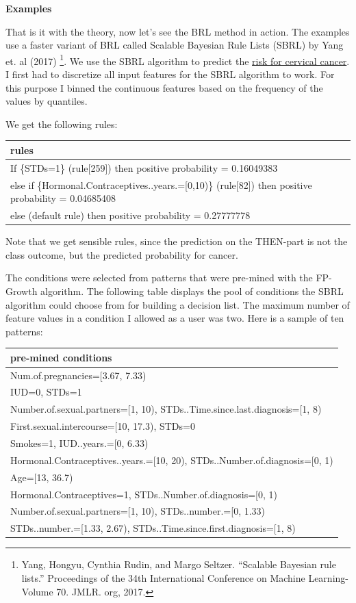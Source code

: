 \documentclass[12pt,]{krantz}
\begin{document}
\textbf{Examples}

That is it with the theory, now let's see the BRL method in action. The
examples use a faster variant of BRL called Scalable Bayesian Rule Lists
(SBRL) by Yang et. al (2017) \footnote{Yang, Hongyu, Cynthia Rudin, and
  Margo Seltzer. ``Scalable Bayesian rule lists.'' Proceedings of the
  34th International Conference on Machine Learning-Volume 70. JMLR.
  org, 2017.}. We use the SBRL algorithm to predict the
\protect\hyperlink{cervical}{risk for cervical cancer}. I first had to
discretize all input features for the SBRL algorithm to work. For this
purpose I binned the continuous features based on the frequency of the
values by quantiles.

We get the following rules:

\begin{tabular}{>{\raggedright\arraybackslash}p{10cm}}
\hline
rules\\
\hline
If      \{STDs=1\} (rule[259]) then positive probability = 0.16049383\\
\hline
else if \{Hormonal.Contraceptives..years.=[0,10)\} (rule[82]) then positive probability = 0.04685408\\
\hline
else  (default rule)  then positive probability = 0.27777778\\
\hline
\end{tabular}

Note that we get sensible rules, since the prediction on the THEN-part
is not the class outcome, but the predicted probability for cancer.

The conditions were selected from patterns that were pre-mined with the
FP-Growth algorithm. The following table displays the pool of conditions
the SBRL algorithm could choose from for building a decision list. The
maximum number of feature values in a condition I allowed as a user was
two. Here is a sample of ten patterns:

\begin{tabular}{>{\raggedright\arraybackslash}p{10cm}}
\hline
pre-mined conditions\\
\hline
Num.of.pregnancies=[3.67, 7.33)\\
\hline
IUD=0, STDs=1\\
\hline
Number.of.sexual.partners=[1, 10), STDs..Time.since.last.diagnosis=[1, 8)\\
\hline
First.sexual.intercourse=[10, 17.3), STDs=0\\
\hline
Smokes=1, IUD..years.=[0, 6.33)\\
\hline
Hormonal.Contraceptives..years.=[10, 20), STDs..Number.of.diagnosis=[0, 1)\\
\hline
Age=[13, 36.7)\\
\hline
Hormonal.Contraceptives=1, STDs..Number.of.diagnosis=[0, 1)\\
\hline
Number.of.sexual.partners=[1, 10), STDs..number.=[0, 1.33)\\
\hline
STDs..number.=[1.33, 2.67), STDs..Time.since.first.diagnosis=[1, 8)\\
\hline
\end{tabular}
\end{document}
